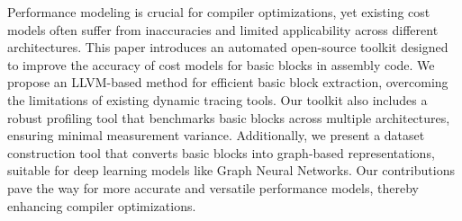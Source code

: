 Performance modeling is crucial for compiler optimizations, yet existing cost models often suffer from
inaccuracies and limited applicability across different architectures. This paper introduces an automated 
open-source toolkit designed to improve the accuracy of cost models for basic blocks in assembly code. We propose an 
LLVM-based method for efficient basic block extraction, overcoming the limitations of existing dynamic 
tracing tools. Our toolkit also includes a robust profiling tool that benchmarks basic blocks across 
multiple architectures, ensuring minimal measurement variance. Additionally, we present a dataset 
construction tool that converts basic blocks into graph-based representations, suitable for deep 
learning models like Graph Neural Networks. Our contributions pave the way for more accurate and 
versatile performance models, thereby enhancing compiler optimizations.
